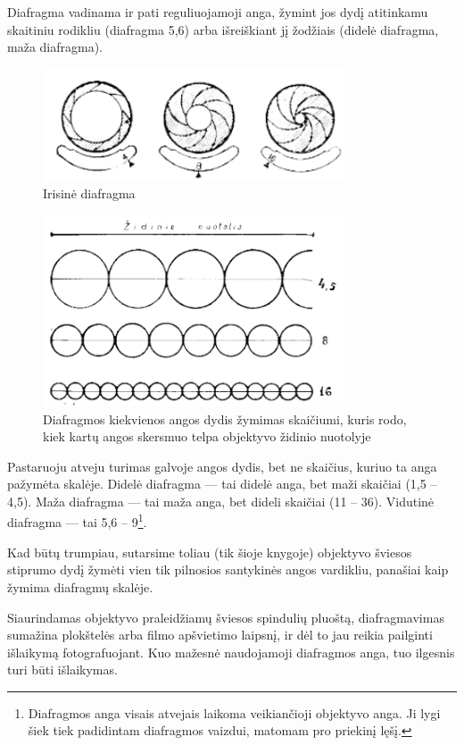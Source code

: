 \documentclass[12pt]{book}
\begin{document}
					Diafragma vadinama ir pati reguliuojamoji anga, žymint jos dydį atitinkamu skaitiniu rodikliu (diafragma 5,6) arba išreiškiant jį žodžiais (didelė diafragma, maža diafragma).
					\begin{figure}[h]
						\centering
						\includegraphics[width=0.8\textwidth]{3-pav}
						\caption{Irisinė diafragma}
						\label{fig:3}
					\end{figure}
					\begin{figure}[h]
						\centering
						\includegraphics[width=0.8\textwidth]{4-pav}
						\caption{Diafragmos kiekvienos angos dydis žymimas skaičiumi, kuris rodo, kiek kartų angos skersmuo telpa objektyvo židinio nuotolyje}
						\label{fig:4}
					\end{figure}
					Pastaruoju atveju turimas galvoje angos dydis, bet ne skaičius, kuriuo ta anga pažymėta skalėje. Didelė diafragma --- tai didelė anga, bet maži skaičiai (1,5 -- 4,5). Maža diafragma --- tai maža anga, bet dideli skaičiai (11 -- 36). Vidutinė diafragma --- tai 5,6 -- 9\footnote{Diafragmos anga visais atvejais laikoma veikiančioji objektyvo anga. Ji lygi šiek tiek padidintam diafragmos vaizdui, matomam pro priekinį lęšį.}.

					Kad būtų trumpiau, sutarsime toliau (tik šioje knygoje) objektyvo šviesos stiprumo dydį žymėti vien tik pilnosios santykinės angos vardikliu, panašiai kaip žymima diafragmų skalėje.

					Siaurindamas objektyvo praleidžiamų šviesos spindulių pluoštą, diafragmavimas sumažina plokštelės arba filmo apšvietimo laipsnį, ir dėl to jau reikia pailginti išlaikymą fotografuojant. Kuo mažesnė naudojamoji diafragmos anga, tuo ilgesnis turi būti išlaikymas.
\end{document}
